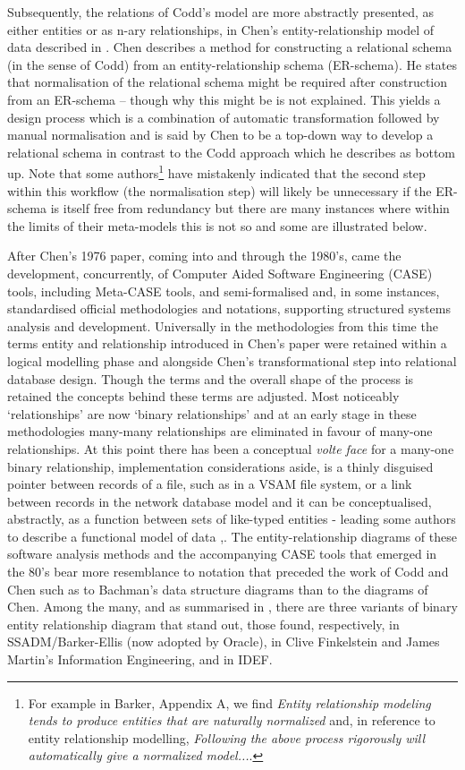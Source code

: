 \documentclass[10pt,a4paper]{article}
\begin{document}
Subsequently, the relations of Codd's model are more abstractly presented, as either entities or as n-ary relationships, in Chen's entity-relationship model of data described in \cite{Chen1976}. 
Chen describes a method for constructing 
a relational schema (in the sense of Codd) from an entity-relationship schema (ER-schema).
He states that normalisation of the relational schema might be required after construction from an ER-schema -- though why this might be is not explained. 
This yields a design process which is a combination of automatic transformation followed by manual
normalisation and is said by Chen to be a top-down way to develop a relational schema in contrast to the Codd approach which he describes as bottom up.
Note that some authors\footnote{For example in Barker, Appendix A,  we find \textit{Entity relationship modeling tends to produce entities that are naturally normalized} and, in reference to entity relationship modelling, \textit{Following the above process  rigorously will automatically give a normalized model...}. } have mistakenly indicated that the second step within this workflow 
(the normalisation step) will likely be unnecessary if the ER-schema is itself free from redundancy
but there are many instances where within the limits of their meta-models this is not so and some are illustrated below. 

After Chen's 1976 paper, coming into and through the 1980's, came the development, concurrently, of Computer Aided Software Engineering (CASE) tools, including Meta-CASE tools, and semi-formalised and, in some instances, standardised official methodologies and notations, supporting structured systems analysis and development. Universally in the methodologies from this time the terms entity and relationship introduced in Chen's paper  were retained within a logical modelling phase and alongside Chen's transformational step into relational database design. Though the terms and the overall shape of the process is retained the concepts behind these terms are adjusted. Most noticeably `relationships' are now `binary relationships' and at an early stage in these methodologies many-many relationships are eliminated in favour of many-one relationships. At this point there has been a conceptual \textit{volte face} for a many-one  binary relationship, implementation considerations aside, is a thinly disguised pointer between records of a file, such as in a VSAM file system,  or a link between records in the network database model and it can be conceptualised, abstractly, as a function between sets of like-typed entities - leading some authors to describe a 
functional model of data \cite{Buneman1979},\cite{Shipman1981}. The entity-relationship diagrams of these software analysis  methods and the accompanying CASE tools
that emerged in the 80's bear more resemblance to notation that preceded the work of Codd and Chen such as to Bachman's data structure diagrams than to the diagrams of Chen.  
Among the many, and as summarised in  \cite{Rock-Evans1989},  there are three variants of binary entity relationship diagram that stand out, those found, respectively,  in SSADM/Barker-Ellis (now adopted by Oracle), in Clive Finkelstein and James Martin's Information Engineering,  and in IDEF.
\end{document}
